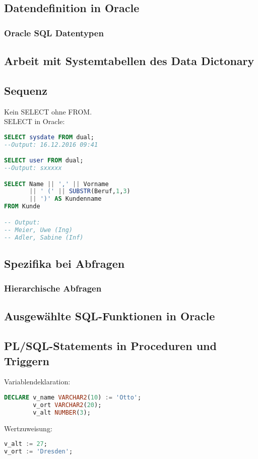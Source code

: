 \subsection{Datendefinition in Oracle}
\subsubsection{Oracle SQL Datentypen}
\subsection{Arbeit mit Systemtabellen des Data Dictonary}
\subsection{Sequenz}
Kein SELECT ohne FROM.\\
SELECT in Oracle:
\begin{lstlisting}[language=SQL]
SELECT sysdate FROM dual;
--Output: 16.12.2016 09:41

SELECT user FROM dual;
--Output: sxxxxx

SELECT Name || ',' || Vorname 
       || ' (' || SUBSTR(Beruf,1,3) 
       || ')' AS Kundenname
FROM Kunde

-- Output:
-- Meier, Uwe (Ing)
-- Adler, Sabine (Inf)
\end{lstlisting}
\subsection{Spezifika bei Abfragen}
\subsubsection{Hierarchische Abfragen}
\subsection{Ausgewählte SQL-Funktionen in Oracle}
\subsection{PL/SQL-Statements in Proceduren und Triggern}
Variablendeklaration:
\begin{lstlisting}[language=SQL]
DECLARE v_name VARCHAR2(10) := 'Otto';
        v_ort VARCHAR2(20);
        v_alt NUMBER(3);
\end{lstlisting}
Wertzuweisung:
\begin{lstlisting}[language=SQL]
v_alt := 27;
v_ort := 'Dresden';
\end{lstlisting}
